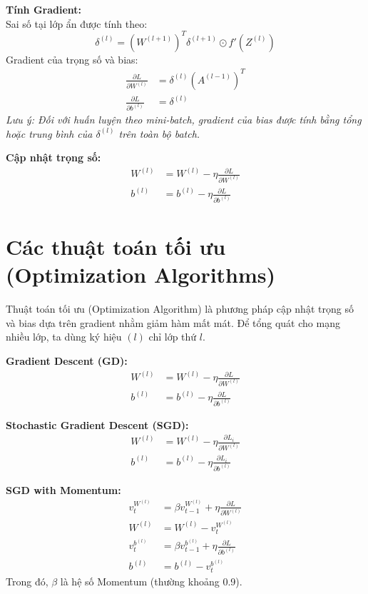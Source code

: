 \documentclass[12pt,a4paper]{report}
\begin{document}
\textbf{Tính Gradient:} \\
Sai số tại lớp ẩn được tính theo:
\begin{equation}
    \delta^{(l)} = (W^{(l+1)})^T \delta^{(l+1)} \odot f'(Z^{(l)})
\end{equation}
Gradient của trọng số và bias:
\begin{align}
    \frac{\partial L}{\partial W^{(l)}} &= \delta^{(l)} (A^{(l-1)})^T \\
    \frac{\partial L}{\partial b^{(l)}} &= \delta^{(l)}
\end{align}
\textit{Lưu ý: Đối với huấn luyện theo mini-batch, gradient của bias được tính bằng tổng hoặc trung bình của $\delta^{(l)}$ trên toàn bộ batch.}

\textbf{Cập nhật trọng số:}
\begin{align}
    W^{(l)} &= W^{(l)} - \eta \frac{\partial L}{\partial W^{(l)}} \\
    b^{(l)} &= b^{(l)} - \eta \frac{\partial L}{\partial b^{(l)}}
\end{align}

\section{Các thuật toán tối ưu (Optimization Algorithms)}
Thuật toán tối ưu (Optimization Algorithm) là phương pháp cập nhật trọng số và bias dựa trên gradient nhằm giảm hàm mất mát. Để tổng quát cho mạng nhiều lớp, ta dùng ký hiệu $(l)$ chỉ lớp thứ $l$.

\textbf{Gradient Descent (GD):}
\begin{align}
    W^{(l)} &= W^{(l)} - \eta \frac{\partial L}{\partial W^{(l)}} \\
    b^{(l)} &= b^{(l)} - \eta \frac{\partial L}{\partial b^{(l)}}
\end{align}

\textbf{Stochastic Gradient Descent (SGD):}
\begin{align}
    W^{(l)} &= W^{(l)} - \eta \frac{\partial L_i}{\partial W^{(l)}} \\
    b^{(l)} &= b^{(l)} - \eta \frac{\partial L_i}{\partial b^{(l)}}
\end{align}

\textbf{SGD with Momentum:}
\begin{align}
    v_t^{W^{(l)}} &= \beta v_{t-1}^{W^{(l)}} + \eta \frac{\partial L}{\partial W^{(l)}} \\
    W^{(l)} &= W^{(l)} - v_t^{W^{(l)}} \\
    v_t^{b^{(l)}} &= \beta v_{t-1}^{b^{(l)}} + \eta \frac{\partial L}{\partial b^{(l)}} \\
    b^{(l)} &= b^{(l)} - v_t^{b^{(l)}}
\end{align}
Trong đó, $\beta$ là hệ số Momentum (thường khoảng 0.9).
\end{document}
